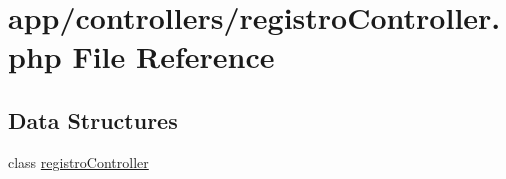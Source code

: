 \hypertarget{registro_controller_8php}{}\section{app/controllers/registro\+Controller.php File Reference}
\label{registro_controller_8php}
\subsection*{Data Structures}
\begin{DoxyCompactItemize}
\item 
class \hyperlink{classregistro_controller}{registro\+Controller}
\end{DoxyCompactItemize}
